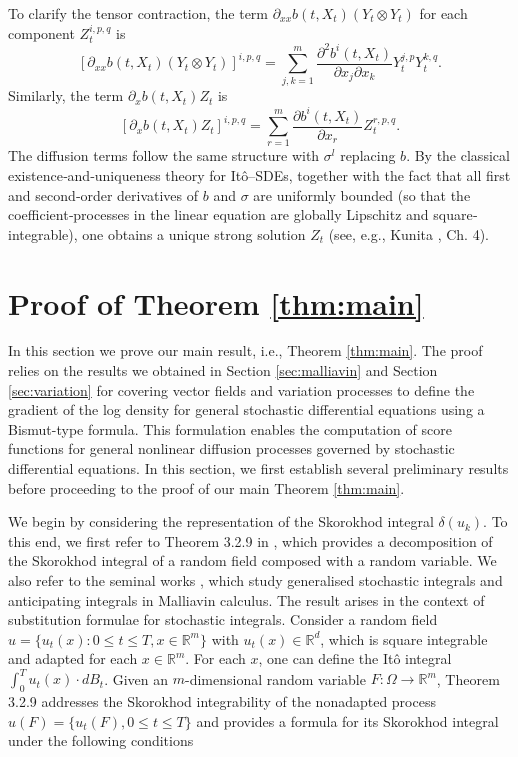 \documentclass[]{interact}
\newcommand{\1}{\mathbf{1}}
\theoremstyle{plain}%
\theoremstyle{definition}
\theoremstyle{remark}
\numberwithin{equation}{section}
\begin{document}
%
To clarify the tensor contraction, the term \(\partial_{xx} b(t, X_t) (Y_t \otimes Y_t)\) for each component \(Z_t^{i,p,q}\) is
\[
\left[ \partial_{xx} b(t, X_t) (Y_t \otimes Y_t) \right]^{i,p,q} = \sum_{j,k=1}^m \frac{\partial^2 b^i(t, X_t)}{\partial x_j \partial x_k} Y_t^{j,p} Y_t^{k,q}.
\]
Similarly, the term \(\partial_x b(t, X_t) Z_t\) is
\[
\left[ \partial_x b(t, X_t) Z_t \right]^{i,p,q} = \sum_{r=1}^m \frac{\partial b^i(t, X_t) }{\partial x_r}Z_t^{r,p,q}.
\]
The diffusion terms follow the same structure with \(\sigma^l\) replacing \(b\). By the classical existence‐and‐uniqueness theory for Itô–SDEs, together with the fact that all first and second‐order derivatives of \(b\) and \(\sigma\) are uniformly bounded (so that the coefficient‐processes in the linear equation are globally Lipschitz and square‐integrable), one obtains a unique strong solution \(Z_t\) (see, e.g., Kunita \cite{kunita1997stochastic}, Ch. 4).  



\section{Proof of Theorem \ref{thm:main}}
\label{sec:proofmain}
In this section we prove our main result, i.e., Theorem \ref{thm:main}. The proof relies on the results we  obtained in Section \ref{sec:malliavin} and Section \ref{sec:variation} for covering vector fields and variation processes to define the gradient of the log density for general stochastic differential equations using a Bismut-type formula. This formulation enables the computation of score functions for general nonlinear diffusion processes governed by stochastic differential equations. In this section, we first establish several preliminary results before proceeding to the proof of our main Theorem \ref{thm:main}.

We begin by considering the representation of the Skorokhod integral $\delta(u_k)$.  To this 	end, we first refer to Theorem 3.2.9 in \cite{nualart2006malliavin}, which provides a decomposition of the Skorokhod integral of a random field composed with a random variable. We also refer to the seminal works \cite{nualart1988stochastic, nualart1986generalized}, which study generalised stochastic integrals and anticipating integrals in Malliavin calculus. The result arises in the context of substitution formulae for stochastic integrals. Consider a random field \( u = \{ u_t(x) : 0 \leq t \leq T, x \in \mathbb{R}^m \} \) with \( u_t(x) \in \mathbb{R}^d \), which is square integrable and adapted for each \( x \in \mathbb{R}^m \). For each \( x \), one can define the It\^o integral \( \int_0^T u_t(x) \cdot dB_t \). Given an \( m \)-dimensional random variable \( F: \Omega \to \mathbb{R}^m \), Theorem 3.2.9 addresses the Skorokhod integrability of the nonadapted process \( u(F) = \{ u_t(F), 0 \leq t \leq T \} \) and provides a formula for its Skorokhod integral under the following conditions
\end{document}
